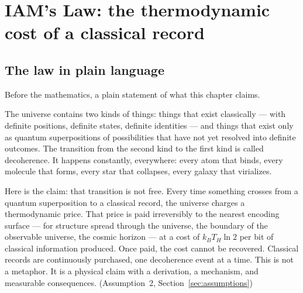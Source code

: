 
\chapter{IAM's Law: the thermodynamic cost of a classical record}\label{ch:iams_law}

\section{The law in plain language}
Before the mathematics, a plain statement of what this chapter claims.

The universe contains two kinds of things: things that exist classically --- with definite positions, definite states, definite identities --- and
things that exist only as quantum superpositions of possibilities that have not yet resolved into definite outcomes. The transition from the second kind
to the first kind is called decoherence. It happens constantly, everywhere: every atom that binds, every molecule that forms, every star that collapses,
every galaxy that virializes.

Here is the claim: that transition is not free. Every time something crosses from a quantum superposition to a classical record, the universe charges a
thermodynamic price. That price is paid irreversibly to the nearest encoding surface --- for structure spread through the universe, the boundary of the
observable universe, the cosmic horizon --- at a cost of $k_BT_H\ln2$ per bit of classical information produced. Once paid, the cost cannot be recovered.
Classical records are continuously purchased, one decoherence event at a time. This is not a metaphor. It is a physical claim with a derivation, a mechanism, and
measurable consequences. \conjecture{} (Assumption~2, Section~\ref{sec:assumptions})


